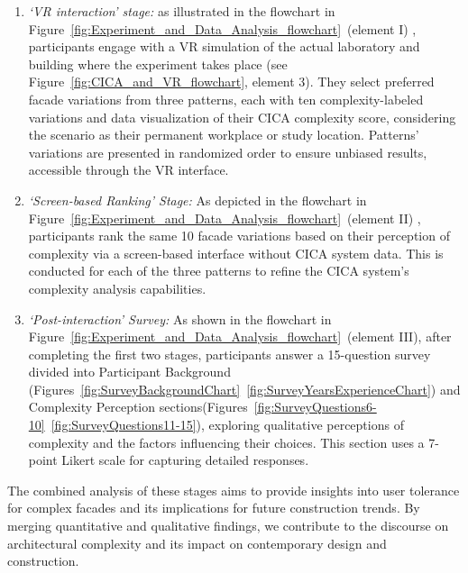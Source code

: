 \begin{enumerate}
    \item \textit{`VR interaction' stage:}  as illustrated in the flowchart in Figure~\ref{fig:Experiment_and_Data_Analysis_flowchart}~(element I) , participants engage with a VR simulation of the actual laboratory and building where the experiment takes place  (see Figure~\ref{fig:CICA_and_VR_flowchart}, element 3). They select preferred facade variations from three patterns, each with ten complexity-labeled variations  and data visualization of their CICA complexity score, considering the scenario as their permanent workplace or study location.
    Patterns' variations are presented in randomized order to ensure unbiased results, accessible through the VR interface.

    \item \textit{`Screen-based Ranking' Stage:} As depicted in the flowchart in Figure~\ref{fig:Experiment_and_Data_Analysis_flowchart}~(element II) , participants rank the same 10 facade variations based on their perception of complexity via a screen-based interface without CICA system data.
    This is conducted for each of the three patterns to refine the CICA system's complexity analysis capabilities.

    \item \textit{`Post-interaction' Survey:} As shown in the flowchart in Figure~\ref{fig:Experiment_and_Data_Analysis_flowchart}~(element III), after completing the first two stages, participants answer a 15-question survey divided into Participant Background (Figures~\ref{fig:SurveyBackgroundChart}~\ref{fig:SurveyYearsExperienceChart}) and Complexity Perception sections(Figures~\ref{fig:SurveyQuestions6-10}~\ref{fig:SurveyQuestions11-15}), exploring qualitative perceptions of complexity and the factors influencing their choices.
    This section uses a 7-point Likert scale for capturing detailed responses.
\end{enumerate}


The combined analysis of these stages aims to provide insights into user tolerance for complex facades and its implications for future construction trends.
By merging quantitative and qualitative findings, we contribute to the discourse on architectural complexity and its impact on contemporary design and construction.